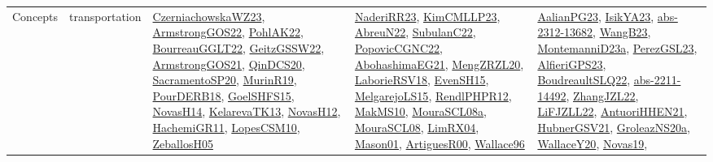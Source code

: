 {\begin{longtable}{lp{3cm}>{\raggedright}p{6cm}>{\raggedright}p{6cm}p{8cm}}
Concepts & transportation & \href{articles/CzerniachowskaWZ23.pdf}{CzerniachowskaWZ23}\cite{CzerniachowskaWZ23}, \href{papers/ArmstrongGOS22.pdf}{ArmstrongGOS22}\cite{ArmstrongGOS22}, \href{articles/PohlAK22.pdf}{PohlAK22}\cite{PohlAK22}, \href{articles/BourreauGGLT22.pdf}{BourreauGGLT22}\cite{BourreauGGLT22}, \href{papers/GeitzGSSW22.pdf}{GeitzGSSW22}\cite{GeitzGSSW22}, \href{papers/ArmstrongGOS21.pdf}{ArmstrongGOS21}\cite{ArmstrongGOS21}, \href{articles/QinDCS20.pdf}{QinDCS20}\cite{QinDCS20}, \href{articles/SacramentoSP20.pdf}{SacramentoSP20}\cite{SacramentoSP20}, \href{papers/MurinR19.pdf}{MurinR19}\cite{MurinR19}, \href{articles/PourDERB18.pdf}{PourDERB18}\cite{PourDERB18}, \href{articles/GoelSHFS15.pdf}{GoelSHFS15}\cite{GoelSHFS15}, \href{articles/NovasH14.pdf}{NovasH14}\cite{NovasH14}, \href{papers/KelarevaTK13.pdf}{KelarevaTK13}\cite{KelarevaTK13}, \href{articles/NovasH12.pdf}{NovasH12}\cite{NovasH12}, \href{articles/HachemiGR11.pdf}{HachemiGR11}\cite{HachemiGR11}, \href{articles/LopesCSM10.pdf}{LopesCSM10}\cite{LopesCSM10}, \href{articles/ZeballosH05.pdf}{ZeballosH05}\cite{ZeballosH05} & \href{articles/NaderiRR23.pdf}{NaderiRR23}\cite{NaderiRR23}, \href{papers/KimCMLLP23.pdf}{KimCMLLP23}\cite{KimCMLLP23}, \href{articles/AbreuN22.pdf}{AbreuN22}\cite{AbreuN22}, \href{articles/SubulanC22.pdf}{SubulanC22}\cite{SubulanC22}, \href{papers/PopovicCGNC22.pdf}{PopovicCGNC22}\cite{PopovicCGNC22}, \href{articles/AbohashimaEG21.pdf}{AbohashimaEG21}\cite{AbohashimaEG21}, \href{articles/MengZRZL20.pdf}{MengZRZL20}\cite{MengZRZL20}, \href{articles/LaborieRSV18.pdf}{LaborieRSV18}\cite{LaborieRSV18}, \href{papers/EvenSH15.pdf}{EvenSH15}\cite{EvenSH15}, \href{papers/MelgarejoLS15.pdf}{MelgarejoLS15}\cite{MelgarejoLS15}, \href{papers/RendlPHPR12.pdf}{RendlPHPR12}\cite{RendlPHPR12}, \href{papers/MakMS10.pdf}{MakMS10}\cite{MakMS10}, \href{papers/MouraSCL08a.pdf}{MouraSCL08a}\cite{MouraSCL08a}, \href{papers/MouraSCL08.pdf}{MouraSCL08}\cite{MouraSCL08}, \href{papers/LimRX04.pdf}{LimRX04}\cite{LimRX04}, \href{articles/Mason01.pdf}{Mason01}\cite{Mason01}, \href{articles/ArtiguesR00.pdf}{ArtiguesR00}\cite{ArtiguesR00}, \href{articles/Wallace96.pdf}{Wallace96}\cite{Wallace96} & \href{papers/AalianPG23.pdf}{AalianPG23}\cite{AalianPG23}, \href{articles/IsikYA23.pdf}{IsikYA23}\cite{IsikYA23}, \href{articles/abs-2312-13682.pdf}{abs-2312-13682}\cite{abs-2312-13682}, \href{papers/WangB23.pdf}{WangB23}\cite{WangB23}, \href{articles/MontemanniD23a.pdf}{MontemanniD23a}\cite{MontemanniD23a}, \href{papers/PerezGSL23.pdf}{PerezGSL23}\cite{PerezGSL23}, \href{articles/AlfieriGPS23.pdf}{AlfieriGPS23}\cite{AlfieriGPS23}, \href{papers/BoudreaultSLQ22.pdf}{BoudreaultSLQ22}\cite{BoudreaultSLQ22}, \href{articles/abs-2211-14492.pdf}{abs-2211-14492}\cite{abs-2211-14492}, \href{papers/ZhangJZL22.pdf}{ZhangJZL22}\cite{ZhangJZL22}, \href{papers/LiFJZLL22.pdf}{LiFJZLL22}\cite{LiFJZLL22}, \href{papers/AntuoriHHEN21.pdf}{AntuoriHHEN21}\cite{AntuoriHHEN21}, \href{articles/HubnerGSV21.pdf}{HubnerGSV21}\cite{HubnerGSV21}, \href{papers/GroleazNS20a.pdf}{GroleazNS20a}\cite{GroleazNS20a}, \href{articles/WallaceY20.pdf}{WallaceY20}\cite{WallaceY20}, \href{articles/Novas19.pdf}{Novas19}\cite{Novas19}, 
\end{longtable}}
